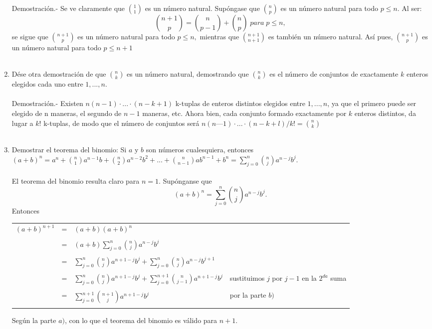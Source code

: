 \begin{ej}
\begin{enumerate}[\bfseries a)]
Demostración.- \; Se ve claramente que ${1 \choose 1}$ es un número natural. Supóngase que ${n \choose p}$ es un número natural para todo $p \leq n$. Al ser: $${ n+1 \choose p } = {n \choose p-1} + {n \choose p} \; para \; p \leq n,$$ se sigue que ${n+1 \choose p}$ es un número natural para todo $p \leq n,$ mientras que ${n+1 \choose n+1}$ es también un número natural. Así pues, ${n+1 \choose p}$ es un número natural para todo $p \leq n+1$\\\\

\item Dése otra demostración de que ${n \choose k}$ es un número natural, demostrando que ${n \choose k}$ es el número de conjuntos de exactamente $k$ enteros elegidos cada uno entre $1,...,n$.\\\\
Demostración.- \; Existen $n(n -1) \cdot ... \cdot (n - k + 1)$ k-tuplas de enteros distintos elegidos entre $1, ..., n$, ya que el primero puede ser elegido de n maneras, el segundo de $n - 1$ maneras, etc. Ahora bien, cada conjunto formado exactamente por $k$ enteros distintos, da lugar a $k!$ k-tuplas, de
modo que el número de conjuntos será $n(n — 1) \cdot ... \cdot (n - k + l)/k! = {n\choose k}$\\\\ 

\item Demostrar el teorema del binomio: Si $a$ \; y \; $b$ son números cualesquiera, entonces
$(a+b)^n = a^n + {n \choose 1} a^{n-1} b + {n \choose 2} a^{n-2} b^2 + ... + {n \choose n-1} a b^{n-1} + b^n = \displaystyle \sum_{j=0}^n {n \choose j} a^{n-j} b^j.$\\\\
El teorema del binomio resulta claro para $n=1.$ Supónganse que $$(a+b)^n = \displaystyle \sum_{j=0}^n {n \choose j} a^{n-j} b^j.$$
Entonces 
\begin{center}
\begin{tabular}{r c l l}
$(a+b)^{n+1}$&=&$(a+b)(a+b)^n$&\\\\
&=&$(a+b) \displaystyle \sum_{j=0}^n {n \choose j} a^{n-j} b^j$&\\\\
&=&$\displaystyle \sum_{j=0}^n {n \choose j} a^{n+1-j} b^j + \sum_{j=0}^{n} {n \choose j} a^{n-j} b^{j+1}$&\\\\
&=&$\displaystyle \sum_{j=0}^n {n \choose j} a^{n+1-j} b^j + \sum_{j=0}^{n+1} {n \choose j-1} a^{n+1-j} b^{j}$&sustituimos $j$ por $j-1$ en la $2^{da}$ suma\\\\
&=&$\displaystyle \sum_{j=0}^{n+1} {n+1 \choose j} a^{n+1-j} b^j$& por la parte $b)$\\\\
\end{tabular}
\end{center}
Según la parte $a)$, con lo que el teorema del binomio es válido para $n+1.$\\\\


\end{enumerate}
\end{ej}
